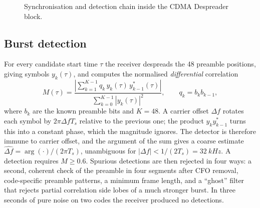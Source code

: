 \documentclass[11pt,a4paper,oneside]{report}
\begin{document}
\begin{figure}[htbp]
\centering
{}
\caption{Synchronisation and detection chain inside the CDMA Despreader block.}\label{fig:rxchain}
\end{figure}

\subsection{Burst detection}
For every candidate start time $\tau$ the receiver despreads the 48 preamble positions, giving
symbols $y_k(\tau)$, and computes the normalised \emph{differential} correlation
\begin{equation}
  M(\tau)=\frac{\left|\sum_{k=1}^{K-1} q_k\, y_k(\tau)\, y_{k-1}^*(\tau)\right|}{\sum_{k=0}^{K-1}|y_k(\tau)|^2},
  \qquad q_k=b_k b_{k-1},
\end{equation}
where $b_k$ are the known preamble bits and $K=48$. A carrier offset $\Delta f$ rotates each symbol
by $2\pi\Delta f T_s$ relative to the previous one; the product $y_k y_{k-1}^*$ turns this into a
constant phase, which the magnitude ignores. The detector is therefore immune to carrier offset, and
the argument of the sum gives a coarse estimate $\widehat{\Delta f}=\arg(\cdot)/(2\pi T_s)$, unambiguous
for $|\Delta f|<1/(2T_s)=\SI{32}{kHz}$. A detection requires $M\ge0.6$. Spurious detections are then
rejected in four ways: a second, coherent check of the preamble in four segments after CFO removal,
code-specific preamble patterns, a minimum frame length, and a ``ghost'' filter that rejects partial
correlation side lobes of a much stronger burst. In three seconds of pure noise on two codes the
receiver produced no detections.
\end{document}
